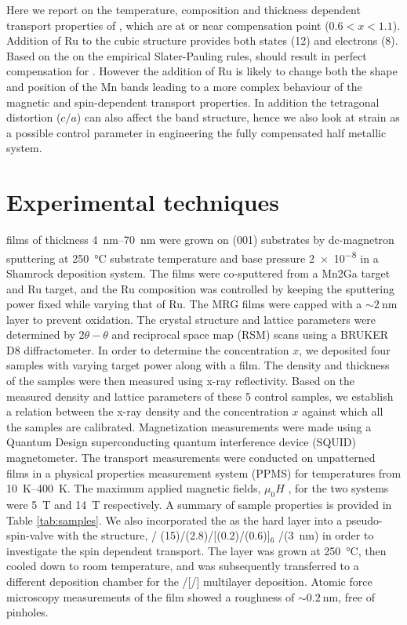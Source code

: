 \documentclass[reprint,aip,apl,floatfix,linenumbers,superscriptaddress]{revtex4-1}
\begin{document}
Here we report on the temperature, composition and thickness dependent 
transport properties of , which are at or near compensation point ($0.
6<x<1.1$). Addition of Ru to the cubic  structure provides both 
states (\num{12}) and electrons (\num{8}). Based on the on the empirical 
Slater-Pauling rules, should result in perfect compensation for . However the addition of Ru is likely to change both the shape and 
position of the Mn bands leading to a more complex behaviour of the magnetic 
and spin-dependent transport properties. In addition the tetragonal 
distortion ($c/a$) can also affect the band structure, hence we also look at 
strain as a possible control parameter in engineering the  fully 
compensated half metallic system.


\section{Experimental techniques}
\label{sec:exp_tech}

 films of thickness \SIrange{4}{70}{\nano\metre} were grown on  (001) substrates by dc-magnetron sputtering at \SI{250}{\celsius} substrate 
temperature and base pressure \SI{2e-8}{\torr} in a Shamrock deposition 
system. The films were co-sputtered from a Mn2Ga target and Ru target, and 
the Ru composition was controlled by keeping the  sputtering power 
fixed while varying that of Ru. The MRG films were capped with a  $\sim \SI{2
}{\nano\metre}$  layer to prevent oxidation.  The crystal structure 
and lattice parameters were determined by $2\theta-\theta$ and reciprocal 
space map (RSM) scans using a BRUKER D8 diffractometer. In order to determine 
the  concentration $x$, we deposited four samples with varying  target power along with a  film. The density and thickness of the 
samples were then measured using x-ray reflectivity. Based on the measured 
density and lattice parameters of these 5 control samples, we establish a 
relation between the x-ray density and the  concentration $x$ against 
which all the samples are calibrated. Magnetization measurements were made 
using a Quantum Design superconducting quantum interference device (SQUID) 
magnetometer. The transport measurements were conducted on unpatterned  films in a physical properties measurement system (PPMS) for temperatures 
from \SIrange{10}{400}{\kelvin}. The maximum applied magnetic fields, $\mu_0H$
, for the two systems were \SI{5}{\tesla} and \SI{14}{\tesla} respectively. A 
summary of sample properties is provided in Table \ref{tab:samples}. We also 
incorporated the  as the hard layer into a pseudo-spin-valve with the 
structure, / (15)/(2.8)/[(0.2)/(0.6)]$_6$
/(\SI{3}{\nano\metre}) in order to investigate the spin dependent 
transport. The  layer was grown at \SI{250}{\celsius}, then cooled 
down to room temperature, and was subsequently transferred to a different 
deposition chamber for the /[/] multilayer deposition. 
Atomic force microscopy measurements of the  film showed a roughness 
of $\sim \SI{0.2}{\nano\metre}$, free of pinholes. 
\end{document}
